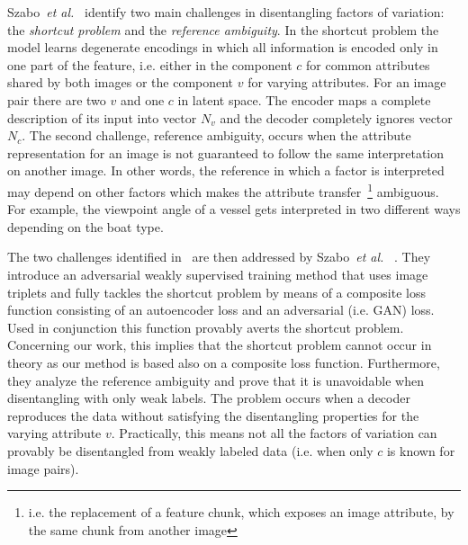 \documentclass[12pt,a4paper]{article}
\begin{document}
Szabo~\textit{et al.}~\cite{ChallengInDisentIFoF} identify two main challenges in disentangling factors of variation: the \textit{shortcut problem} and the \textit{reference ambiguity}. In the shortcut problem the model learns degenerate encodings in which all information is encoded only in one part of the feature, i.e. either in the component $c$ for common attributes shared by both images or the component $v$ for varying attributes. For an image pair there are two $v$ and one $c$ in latent space. The encoder maps a complete description of its input into vector $N_v$ and the decoder completely ignores vector $N_c$.
The second challenge, reference ambiguity, occurs when the attribute representation for an image is not guaranteed to follow the same interpretation on another image. In other words, the reference in which a factor is interpreted may depend on other factors which makes the attribute transfer~\footnote{i.e. the replacement of a feature chunk, which exposes an image attribute, by the same chunk from another image} ambiguous. For example, the viewpoint angle of a vessel gets interpreted in two different ways depending on the boat type.
\par The two challenges identified in~\cite{ChallengInDisentIFoF} are then addressed by Szabo~\textit{et al.}~ \cite{UnderstDegenAndAmbInAT}. They introduce an adversarial weakly supervised training method that uses image triplets and fully tackles the shortcut problem by means of a composite loss function consisting of an autoencoder loss and an adversarial (i.e. GAN) loss. Used in conjunction this function provably averts the shortcut problem. Concerning our work, this implies that the shortcut problem cannot occur in theory as our method is based also on a composite loss function. Furthermore, they analyze the reference ambiguity and prove that it is unavoidable when disentangling with only weak labels. The problem occurs when a decoder reproduces the data without satisfying the disentangling properties for the varying attribute $v$. Practically, this means not all the factors of variation can provably be disentangled from weakly labeled data (i.e. when only $c$ is known for image pairs).    
\end{document}
